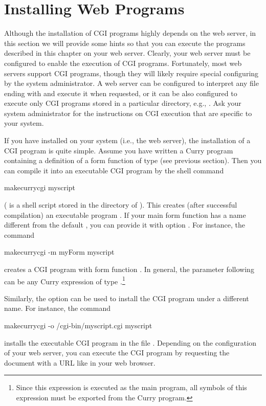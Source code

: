            
\section{Installing Web Programs}
\label{sec-cgi-install}

Although the installation of CGI programs highly depends on the web server, in this section we will provide some hints so that you can
execute the programs described in this chapter on your web server.
Clearly, your web server must be configured to enable the execution of
CGI programs. Fortunately, most web servers support CGI programs, though they will likely require special configuring by the system administrator.
A web server can be configured to interpret any file ending
with  and execute it when requested, or it
can be also configured to execute only CGI programs stored
in a particular directory, e.g., .
Ask your system administrator for the instructions on CGI execution that are specific to your system.

If you have installed \pakcs{} on your system (i.e., the web server),
the installation of a CGI program is quite simple.
Assume you have written a Curry program 
containing a definition of a form function 
of type  (see previous section).
Then you can compile it into an executable CGI program
by the shell command
\begin{prog}
makecurrycgi myscript
\end{prog}
( is a shell script
stored in the  directory of \pakcs).
This creates (after successful compilation) an executable program
.
If your main form function has a name different from the default ,
you can provide it with option . For instance,
the command
\begin{prog}
makecurrycgi -m myForm myscript
\end{prog}
creates a CGI program with form function .
In general, the parameter following  can be any Curry expression
of type .\footnote{%
Since this expression is executed as the main program,
all symbols of this expression must be exported from the
Curry program.}

Similarly, the option  can be used to install the CGI program
under a different name. For instance, the command
\begin{prog}
makecurrycgi -o /cgi-bin/myscript.cgi myscript
\end{prog}
installs the executable CGI program
in the file .
Depending on the configuration of your web server,
you can execute the CGI program by requesting the
document with a URL like
in your web browser.


